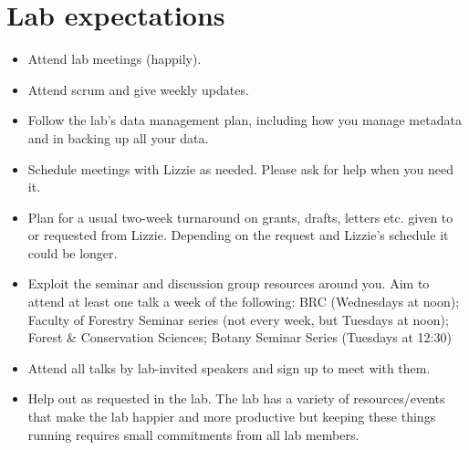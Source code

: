 \documentclass[11pt,a4paper,oneside]{article}
\begin{document}
\section{Lab expectations}
\begin{itemize}
\item Attend lab meetings (happily). %
\item Attend scrum and give weekly updates. 
\item Follow the lab's data management plan, including how you manage metadata and in backing up all your data.
\item Schedule meetings with Lizzie as needed. Please ask for help when you need it.
\item Plan for a usual two-week turnaround on grants, drafts, letters etc. given to or requested from Lizzie. Depending on the request and Lizzie's schedule it could be longer.  
\item Exploit the seminar and discussion group resources around you. Aim to attend at least one talk a week of the following: BRC (Wednesdays at noon); Faculty of Forestry Seminar series (not every week, but Tuesdays at noon); Forest \& Conservation Sciences; Botany Seminar Series (Tuesdays at 12:30)
\item Attend all talks by lab-invited speakers and sign up to meet with them. 
\item Help out as requested in the lab. The lab has a variety of resources/events that make the lab happier and more productive but keeping these things running requires small commitments from all lab members. 


\end{itemize}
\end{document}
